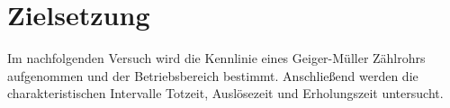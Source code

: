 \section{Zielsetzung}
\label{sec:zielsetzung}

Im nachfolgenden Versuch wird die Kennlinie eines Geiger-Müller Zählrohrs aufgenommen und der Betriebsbereich bestimmt. Anschließend werden die
charakteristischen Intervalle Totzeit, Auslösezeit und Erholungszeit untersucht.
